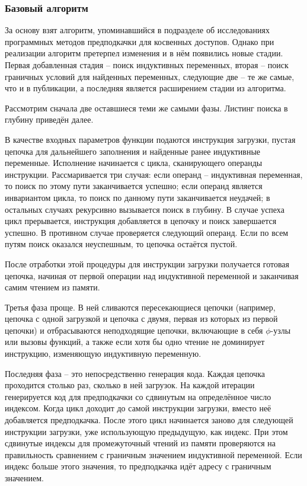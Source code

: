 \documentclass[12pt,a4paper]{article}
\begin{document}
\subsubsection{Базовый алгоритм}

\indent

За основу взят алгоритм, упоминавшийся в подразделе об исследованиях программных методов предподкачки для косвенных доступов. Однако при реализации алгоритм претерпел изменения и в нём появились новые стадии. Первая добавленная стадия -- поиск индуктивных переменных, вторая -- поиск граничных условий для найденных переменных, следующие две -- те же самые, что и в публикации, а последняя является расширением стадии из алгоритма.

Рассмотрим сначала две оставшиеся теми же самыми фазы. Листинг поиска в глубину приведён далее.



В качестве входных параметров функции подаются инструкция загрузки, пустая цепочка для дальнейшего заполнения и найденные ранее индуктивные переменные. Исполнение начинается с цикла, сканирующего операнды инструкции. Рассмаривается три случая: если операнд -- индуктивная переменная, то поиск по этому пути заканчивается успешно; если операнд является инвариантом цикла, то поиск по данному пути заканчивается неудачей; в остальных случаях рекурсивно вызывается поиск в глубину. В случае успеха цикл прерывается, инструкция добавляется в цепочку и поиск завершается успешно. В противном случае проверяется следующий операнд. Если по всем путям поиск оказался неуспешным, то цепочка остаётся пустой.

После отработки этой процедуры для инструкции загрузки получается готовая цепочка, начиная от первой операции над индуктивной переменной и заканчивая самим чтением из памяти.

Третья фаза проще. В ней сливаются пересекающиеся цепочки (например, цепочка с одной загрузкой и цепочка с двумя, первая из которых из первой цепочки) и отбрасываются неподходящие цепочки, включающие в себя $\phi$-узлы или вызовы функций, а также если хотя бы одно чтение не доминирует инструкцию, изменяющую индуктивную переменную.

Последняя фаза -- это непосредственно генерация кода. Каждая цепочка проходится столько раз, сколько в ней загрузок. На каждой итерации генерируется код для предподкачки со сдвинутым на определённое число индексом. Когда цикл доходит до самой инструкции загрузки, вместо неё добавляется предподкачка. После этого цикл начинается заново для следующей инструкции загрузки, уже использующую предыдущую, как индекс. При этом сдвинутые индексы для промежуточный чтений из памяти проверяются на правильность сравнением с граничным значением индуктивной переменной. Если индекс больше этого значения, то предподкачка идёт адресу с граничным значением.
\end{document}
